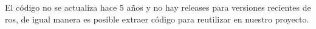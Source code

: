 El código no se actualiza hace 5 años y no hay releases para versiones recientes de ros, de igual manera es posible extraer código para reutilizar en nuestro proyecto.











